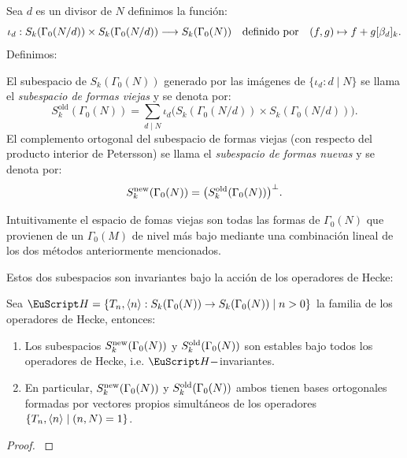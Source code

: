 \documentclass[../../tesis_maestria]{subfiles}
\begin{document}
Sea $d$ es un divisor de $N$ definimos la funci\'on:
\[
  \iota_d:S_k(\Gamma_0(N/d))\times S_k(\Gamma_0(N/d))\longrightarrow S_k(\Gamma_0(N))
  \quad\text{definido por}\quad (f,g)\mapsto f+g[\beta_d]_k.
\]
Definimos:
\begin{defin}
  El subespacio de $S_k(\Gamma_0(N))$ generado por las im\'agenes de $\{\iota_d: d\mid N\}$ se
  llama el \emph{subespacio de formas viejas} y se denota por:
  \[
    S_k^{\mathrm{old}}(\Gamma_0(N))
    =\sum_{d\mid N}\iota_d\big(S_k(\Gamma_0(N/d))\times S_k(\Gamma_0(N/d))\big).
  \]
  El complemento ortogonal del subespacio de formas viejas (con respecto del producto interior de
  Petersson) se llama el \emph{subespacio de formas nuevas} y se denota por:
  \[
    S_k^{\mathrm{new}}(\Gamma_0(N))=\big(S_k^{\mathrm{old}}(\Gamma_0(N))\big)^{\perp}.
  \]
\end{defin}

Intuitivamente el espacio de fomas viejas son todas las formas de $\Gamma_0(N)$ que provienen de un
$\Gamma_0(M)$ de nivel m\'as bajo mediante una combinaci\'on lineal de los dos m\'etodos anteriormente
mencionados.

Estos dos subespacios son invariantes bajo la acción de los operadores de Hecke:

\begin{prop}\label{prop:snew}
  Sea $\Hh=\{T_n,\gen{n}:\Sk\ra\Sk\mid n>0\}$ la familia de los operadores de Hecke, entonces:
  \begin{enumerate}[label=\roman*)]
  \item Los subespacios $S_k^{\mathrm{new}}(\Gamma_0(N))$ y $S_k^{\mathrm{old}}(\Gamma_0(N))$ son estables bajo todos los operadores de Hecke, i.e. $\Hh-$invariantes.
  \item En particular, $S_k^{\mathrm{new}}(\Gamma_0(N))$ y $S_k^{\mathrm{old}}(\Gamma_0(N))$ ambos tienen bases ortogonales formadas por vectores
    propios simult\'aneos de los operadores $\{T_n,\langle n \rangle\mid(n,N)=1\}$.
  \end{enumerate}
\end{prop}
\begin{proof}\cite[\S5.7]{DiamondShurmanAFCIMF}
\end{proof}
\end{document}
